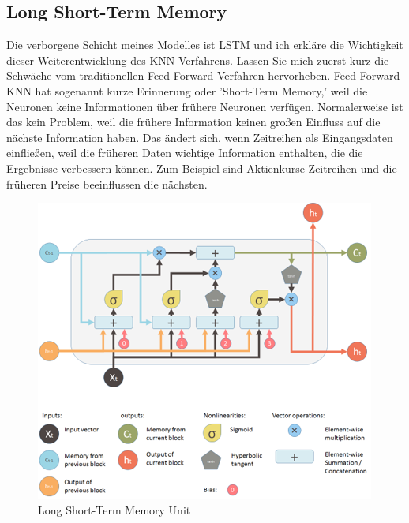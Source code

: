 \documentclass[12pt]{article}
\begin{document}
        \subsection{Long Short-Term Memory}

            Die verborgene Schicht meines Modelles ist LSTM und ich erkläre die Wichtigkeit dieser Weiterentwicklung des KNN-Verfahrens. 
            Lassen Sie mich zuerst kurz die Schwäche vom traditionellen Feed-Forward Verfahren hervorheben. 
            Feed-Forward KNN hat sogenannt kurze Erinnerung oder 'Short-Term Memory,'
            weil die Neuronen keine Informationen über frühere Neuronen verfügen. 
            Normalerweise ist das kein Problem, weil die frühere Information keinen großen Einfluss auf die nächste Information haben. 
            Das ändert sich, wenn Zeitreihen als Eingangsdaten einfließen, 
            weil die früheren Daten wichtige Information enthalten, die die Ergebnisse verbessern können. 
            Zum Beispiel sind Aktienkurse Zeitreihen und die früheren Preise beeinflussen die nächsten. 
            
            \begin{figure}[ht]
            
                \begin{center}

                    \includegraphics[scale=0.6]{lstm-yan.png}
                    \caption{Long Short-Term Memory Unit \cite{yan2016}}
        
                \end{center}
                
            \end{figure}
\end{document}
